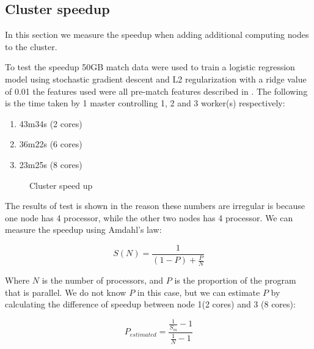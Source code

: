 \subsection{Cluster speedup}\label{sec:speedup}
In this section we measure the speedup when adding additional computing nodes to the cluster.

To test the speedup 50GB match data were used to train a logistic regression model using stochastic gradient descent and L2 regularization with a ridge value of 0.01 the features used were all pre-match features described in  . The following is the time taken by 1 master controlling 1, 2 and 3 worker(s) respectively:

\begin{enumerate}
    \item 43m34s (2 cores)
    \item 36m22s (6 cores)
    \item 23m25s (8 cores)
\end{enumerate}


\begin{figure}[!htb]
  \centering
   \caption{Cluster speed up}\label{fig:cluster-speedup}
\end{figure}
The results of test is shown in  the reason these numbers are irregular is because one node has 4 processor, while the other two nodes has 4 processor. We can measure the speedup using Amdahl's law:

\[S(N) = \frac{1}{(1-P)+\frac{P}{N}}\]

Where $N$ is the number of processors, and $P$ is the proportion of the program that is parallel. We do not know $P$ in this case, but we can estimate $P$ by calculating the difference of speedup between node 1(2 cores) and 3 (8 cores):

\[P_{estimated} = \frac{\frac{1}{S_m}-1}{\frac{1}{N}-1}  \]

